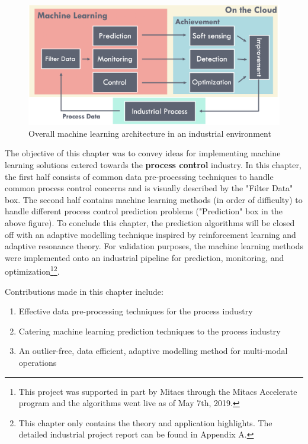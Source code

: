 \begin{figure}[h]
    \centering
    \includegraphics[width=\textwidth]{images/ch2/02AICloud.png}
    \caption{Overall machine learning architecture in an industrial environment}
    \label{fig:02AICloud}
\end{figure}

The objective of this chapter was to convey ideas for implementing machine learning solutions catered towards the \textbf{process control} industry.  In this chapter, the first half consists of common data pre-processing techniques to handle common process control concerns and is visually described by the "Filter Data" box.  The second half contains machine learning methods (in order of difficulty) to handle different process control prediction problems ("Prediction" box in the above figure). To conclude this chapter, the prediction algorithms will be closed off with an adaptive modelling technique inspired by reinforcement learning and adaptive resonance theory. For validation purposes, the machine learning methods were implemented onto an industrial pipeline for prediction, monitoring, and optimization\footnote{This project was supported in part by Mitacs through the Mitacs Accelerate program and the algorithms went live as of May 7th, 2019.}\footnote{This chapter only contains the theory and application highlights. The detailed industrial project report can be found in Appendix A.}.

Contributions made in this chapter include:
\begin{enumerate}
    \item Effective data pre-processing techniques for the process industry
    \item Catering machine learning prediction techniques to the process industry
    \item An outlier-free, data efficient, adaptive modelling method for multi-modal operations
\end{enumerate}

